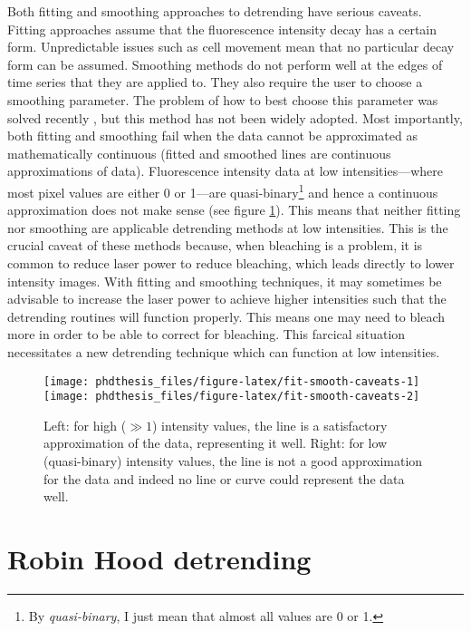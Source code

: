 \documentclass[12pt,]{book}
\let\rmarkdownfootnote\footnote%
\def\footnote{\protect\rmarkdownfootnote}
\theoremstyle{definition}
\theoremstyle{definition}
\theoremstyle{definition}
\theoremstyle{remark}
\begin{document}
Both fitting and smoothing approaches to detrending have serious
caveats. Fitting approaches assume that the fluorescence intensity decay
has a certain form. Unpredictable issues such as cell movement mean that
no particular decay form can be assumed. Smoothing methods do not
perform well at the edges of time series that they are applied to. They
also require the user to choose a smoothing parameter. The problem of
how to best choose this parameter was solved recently \citep{nandb}, but
this method has not been widely adopted. Most importantly, both fitting
and smoothing fail when the data cannot be approximated as
mathematically continuous (fitted and smoothed lines are continuous
approximations of data). Fluorescence intensity data at low
intensities---where most pixel values are either 0 or 1---are
quasi-binary\footnote{By \emph{quasi-binary}, I just mean that almost
  all values are 0 or 1.} and hence a continuous approximation does not
make sense (see figure \ref{fig:fit-smooth-caveats}). This means that
neither fitting nor smoothing are applicable detrending methods at low
intensities. This is the crucial caveat of these methods because, when
bleaching is a problem, it is common to reduce laser power to reduce
bleaching, which leads directly to lower intensity images. With fitting
and smoothing techniques, it may sometimes be advisable to increase the
laser power to achieve higher intensities such that the detrending
routines will function properly. This means one may need to bleach more
in order to be able to correct for bleaching. This farcical situation
necessitates a new detrending technique which can function at low
intensities.







\begin{figure}

\texttt{[image: phdthesis\_files/figure-latex/fit-smooth-caveats-1]} \texttt{[image: phdthesis\_files/figure-latex/fit-smooth-caveats-2]} \hfill{}

\caption{Left: for high (\(\gg 1\)) intensity
values, the line is a satisfactory approximation of the data,
representing it well. Right: for low (quasi-binary) intensity values,
the line is not a good approximation for the data and indeed no line or
curve could represent the data well.}\label{fig:fit-smooth-caveats}
\end{figure}

\section{Robin Hood detrending}\label{robin-hood-detrending}
\end{document}
